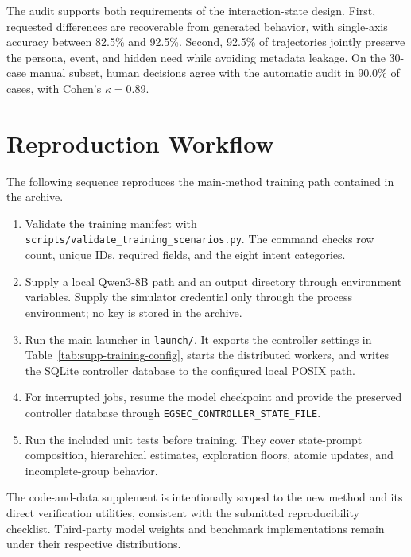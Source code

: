 The audit supports both requirements of the interaction-state design. First,
requested differences are recoverable from generated behavior, with single-axis
accuracy between 82.5\% and 92.5\%. Second, 92.5\% of trajectories jointly
preserve the persona, event, and hidden need while avoiding metadata leakage.
On the 30-case manual subset, human decisions agree with the automatic audit in
90.0\% of cases, with Cohen's $\kappa=0.89$.

\section{Reproduction Workflow}
The following sequence reproduces the main-method training path contained in
the archive.
\begin{enumerate}
  \item Validate the training manifest with
  \texttt{scripts/validate\_training\_scenarios.py}. The command checks row
  count, unique IDs, required fields, and the eight intent categories.
  \item Supply a local Qwen3-8B path and an output directory through environment
  variables. Supply the simulator credential only through the process
  environment; no key is stored in the archive.
  \item Run the main launcher in \texttt{launch/}. It exports the controller
  settings in Table~\ref{tab:supp-training-config}, starts the distributed
  workers, and writes the SQLite controller database to the configured local
  POSIX path.
  \item For interrupted jobs, resume the model checkpoint and provide the
  preserved controller database through
  \texttt{EGSEC\_CONTROLLER\_STATE\_FILE}.
  \item Run the included unit tests before training. They cover state-prompt
  composition, hierarchical estimates, exploration floors, atomic updates,
  and incomplete-group behavior.
\end{enumerate}

The code-and-data supplement is intentionally scoped to the new method and its
direct verification utilities, consistent with the submitted reproducibility
checklist. Third-party model weights and benchmark implementations remain under
their respective distributions.
